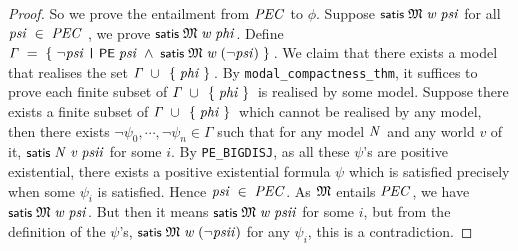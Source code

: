 \documentclass[letterpaper]{article}
\renewcommand{\HOLConst}[1]{{\textsf{\upshape\small #1}}}
\renewcommand{\HOLinline}[1]{\ensuremath{#1}}
\begin{document}
\begin{proof}
So we prove the entailment from \HOLinline{\HOLFreeVar{PEC}} to $\phi$. Suppose \HOLinline{\HOLConst{satis}\;\HOLFreeVar{\ensuremath{\mathfrak{M}}}\;\HOLFreeVar{w}\;\HOLFreeVar{psi}} for all \HOLinline{\HOLFreeVar{psi}\;\HOLSymConst{\HOLTokenIn{}}\;\HOLFreeVar{PEC}} , we prove \HOLinline{\HOLConst{satis}\;\HOLFreeVar{\ensuremath{\mathfrak{M}}}\;\HOLFreeVar{w}\;\HOLFreeVar{phi}}. Define \HOLinline{\HOLFreeVar{\ensuremath{\Gamma}}\;\HOLSymConst{=}\;\HOLTokenLeftbrace{}\HOLSymConst{\HOLTokenNeg{}}\HOLBoundVar{psi}\;\HOLTokenBar{}\;\HOLConst{PE}\;\HOLBoundVar{psi}\;\HOLSymConst{\HOLTokenConj{}}\;\HOLConst{satis}\;\HOLFreeVar{\ensuremath{\mathfrak{M}}}\;\HOLFreeVar{w}\;(\HOLSymConst{\HOLTokenNeg{}}\HOLBoundVar{psi})\HOLTokenRightbrace{}}. We claim that there exists a model that realises the set \HOLinline{\HOLFreeVar{\ensuremath{\Gamma}}\;\HOLSymConst{\HOLTokenUnion{}}\;\HOLTokenLeftbrace{}\HOLFreeVar{phi}\HOLTokenRightbrace{}}. By \texttt{modal_compactness_thm}, it suffices to prove each finite subset of \HOLinline{\HOLFreeVar{\ensuremath{\Gamma}}\;\HOLSymConst{\HOLTokenUnion{}}\;\HOLTokenLeftbrace{}\HOLFreeVar{phi}\HOLTokenRightbrace{}} is realised by some model. Suppose there exists a finite subset of \HOLinline{\HOLFreeVar{\ensuremath{\Gamma}}\;\HOLSymConst{\HOLTokenUnion{}}\;\HOLTokenLeftbrace{}\HOLFreeVar{phi}\HOLTokenRightbrace{}} which cannot be realised by any model, then there exists $\lnot\psi_0,\cdots,\lnot\psi_n\in \Gamma$ such that for any model \HOLinline{\HOLFreeVar{N}} and any world $v$ of it, \HOLinline{\HOLConst{satis}\;\HOLFreeVar{N}\;\HOLFreeVar{v}\;\HOLFreeVar{psii}} for some $i$. By \texttt{PE_BIGDISJ}, as all these $\psi$'s are positive existential, there exists a positive existential formula $\psi$ which is satisfied precisely when some $\psi_i$ is satisfied. Hence \HOLinline{\HOLFreeVar{psi}\;\HOLSymConst{\HOLTokenIn{}}\;\HOLFreeVar{PEC}}. As \HOLinline{\HOLFreeVar{\ensuremath{\mathfrak{M}}}} entails \HOLinline{\HOLFreeVar{PEC}}, we have \HOLinline{\HOLConst{satis}\;\HOLFreeVar{\ensuremath{\mathfrak{M}}}\;\HOLFreeVar{w}\;\HOLFreeVar{psi}}. But then it means \HOLinline{\HOLConst{satis}\;\HOLFreeVar{\ensuremath{\mathfrak{M}}}\;\HOLFreeVar{w}\;\HOLFreeVar{psii}} for some $i$, but from the definition of the $\psi$'s, \HOLinline{\HOLConst{satis}\;\HOLFreeVar{\ensuremath{\mathfrak{M}}}\;\HOLFreeVar{w}\;(\HOLSymConst{\HOLTokenNeg{}}\HOLFreeVar{psii})} for any $\psi_i$, this is a contradiction. 


\end{proof}
\end{document}
